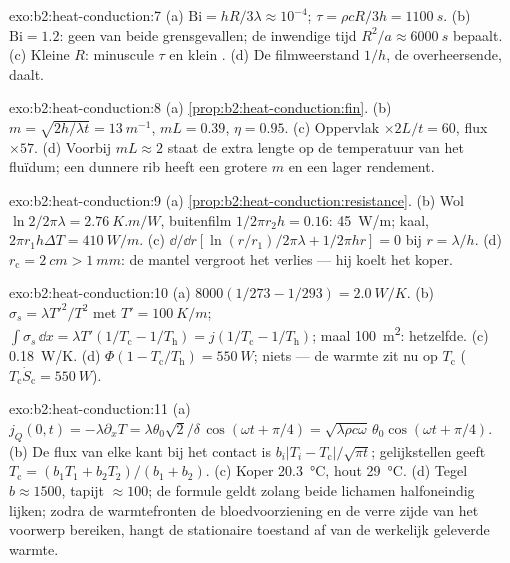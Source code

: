 \begin{solution}{exo:b2:heat-conduction:7}
(a) $\mathrm{Bi} = hR/3\lambda \approx 10^{-4}$;
$\tau = \rho cR/3h = \qty{1100}{s}$.
(b) $\mathrm{Bi} = 1.2$: geen van beide grensgevallen; de inwendige tijd
$R^2/a \approx
\qty{6000}{s}$ bepaalt. (c) Kleine $R$: minuscule $\tau$ en
klein .
(d) De filmweerstand $1/h$, de overheersende, daalt.
\end{solution}

\begin{solution}{exo:b2:heat-conduction:8}
(a) \cref{prop:b2:heat-conduction:fin}. (b)
$m = \sqrt{2h/\lambda t} =
\qty{13}{m^{-1}}$, $mL = 0.39$, $\eta = 0.95$.
(c) Oppervlak $\times 2L/t = 60$, flux
$\times 57$. (d) Voorbij $mL \approx 2$ staat de extra lengte op de temperatuur
van het fluïdum; een dunnere rib heeft een grotere $m$ en een lager rendement.
\end{solution}

\begin{solution}{exo:b2:heat-conduction:9}
(a) \cref{prop:b2:heat-conduction:resistance}. (b) Wol
$\ln 2/2\pi\lambda =
\qty{2.76}{K.m/W}$, buitenfilm $1/2\pi r_2h = 0.16$:
\qty{45}{W/m}; kaal,
$2\pi r_1h\Delta T = \qty{410}{W/m}$. (c)
$\dd/\dd r[\ln(r/r_1)/2\pi\lambda + 1/2\pi hr]
= 0$ bij $r = \lambda/h$. (d)
$r_{\text{c}} = \qty{2}{cm} > \qty{1}{mm}$: de mantel
vergroot het verlies --- hij koelt het koper.
\end{solution}

\begin{solution}{exo:b2:heat-conduction:10}
(a) $8000(1/273 - 1/293) = \qty{2.0}{W/K}$. (b) $\sigma_s = \lambda T'^2/T^2$ met
$T' = \qty{100}{K/m}$;
$\int\sigma_s\,\dd x = \lambda T'(1/T_{\text{c}} - 1/T_{\text{h}})
= j(1/T_{\text{c}} - 1/T_{\text{h}})$;
maal \qty{100}{m^2}: hetzelfde. (c)
\qty{0.18}{W/K}. (d) $\Phi(1 - T_{\text{c}}/T_{\text{h}}) = \qty{550}{W}$; niets
--- de warmte zit nu op $T_{\text{c}}$
($T_{\text{c}}\dot S_{\text{c}} = \qty{550}{W}$).
\end{solution}

\begin{solution}{exo:b2:heat-conduction:11}
(a)
$j_Q(0,t) = -\lambda\partial_xT = \lambda\theta_0\sqrt2/\delta\,\cos(\omega t +
\pi/4) = \sqrt{\lambda\rho c\omega}\,\theta_0\cos(\omega t + \pi/4)$.
(b) De flux
van elke kant bij het contact is $b_i|T_i - T_{\text{c}}|/\sqrt{\pi t}$;
gelijkstellen geeft
$T_{\text{c}} = (b_1T_1 + b_2T_2)/(b_1 + b_2)$. (c) Koper \qty{20.3}{\celsius},
hout \qty{29}{\celsius}. (d) Tegel $b \approx 1500$, tapijt $\approx 100$; de
formule geldt zolang beide lichamen halfoneindig lijken; zodra de
warmtefronten de bloedvoorziening en de verre zijde van het voorwerp
bereiken, hangt de stationaire
toestand af van de werkelijk geleverde warmte.
\end{solution}

